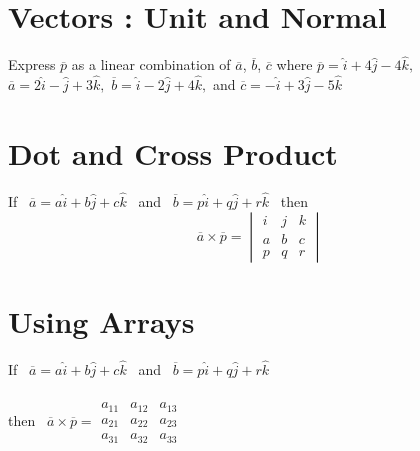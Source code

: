 \documentclass[17pt]{extarticle}
\begin{document}
\section{Vectors : Unit and Normal}
Express $\overline{p}$ as a linear combination of 
$\overline{a}$, $\overline{b}$, $\overline{c}$ where 
$\overline{p} =\hat{i} + 4\hat{j} - 4\hat{k},$
$\overline{a} =2\hat{i} - \hat{j} + 3\hat{k},$ 
$\overline{b} =\hat{i} - 2\hat{j} + 4\hat{k},$ \; and \;
$\overline{c} =-\hat{i} + 3\hat{j} - 5\hat{k} $

\section{Dot and Cross Product} 
If \ $\overline{a} =a\hat{i} + b\hat{j} + c\hat{k}$ \ and  \
$\overline{b} =p\hat{i} + q\hat{j} + r\hat{k}$ \ then
\[ \overline{a} \times \overline{p} = \begin{vmatrix} i&j&k\\ a&b&c\\ p&q&r \end{vmatrix}\]

\section{Using Arrays}
If \ $\overline{a} =a\hat{i} + b\hat{j} + c\hat{k}$ \ and \ 
$\overline{b} =p\hat{i} + q\hat{j} + r\hat{k}$\ \\ \\  then \
\( \overline{a} \times \overline{p} =  
\begin{array}{|ccc|} 
a_{11} & a_{12} & a_{13}\\ 
a_{21} & a_{22} & a_{23}\\
a_{31} & a_{32} & a_{33}
\end{array} 
\) 
\end{document}
